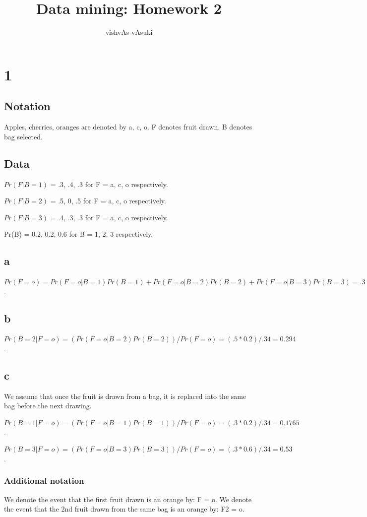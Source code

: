 \documentclass{article}
\title{Data mining: Homework 2}
\author{vishvAs vAsuki}
\begin{document}
\maketitle

\section{1}
\subsection{Notation}
Apples, cherries, oranges are denoted by a, c, o. F denotes fruit drawn. B denotes bag selected.

\subsection{Data}
$Pr(F|B=1)$ = .3, .4, .3 for F = a, c, o respectively.

$Pr(F|B=2)$ = .5, 0, .5 for F = a, c, o respectively.

$Pr(F|B=3)$ = .4, .3, .3 for F = a, c, o respectively.

Pr(B) = 0.2, 0.2, 0.6 for B = 1, 2, 3 respectively.

\subsection{a}
$Pr(F = o) = Pr(F = o|B=1)Pr(B=1) + Pr(F = o|B=2)Pr(B=2) + Pr(F = o|B=3)Pr(B=3) = .3*0.2 + .5*.2 + .3*.6 = 0.34$.

\subsection{b}
$Pr(B = 2|F=o) = (Pr(F=o|B=2) Pr(B=2))/ Pr(F=o) = (.5*0.2)/.34 = 0.294$.

\subsection{c}
We assume that once the fruit is drawn from a bag, it is replaced into the same bag before the next drawing.

$Pr(B = 1|F=o) = (Pr(F=o|B=1) Pr(B=1))/ Pr(F=o) = (.3*0.2)/.34 = 0.1765$.

$Pr(B = 3|F=o) = (Pr(F=o|B=3) Pr(B=3))/ Pr(F=o) = (.3*0.6)/.34 = 0.53$.

\subsubsection{Additional notation}
We denote the event that the first fruit drawn is an orange by: F = o. We denote the event that the 2nd fruit drawn from the same bag is an orange by: F2 = o.
\end{document}
